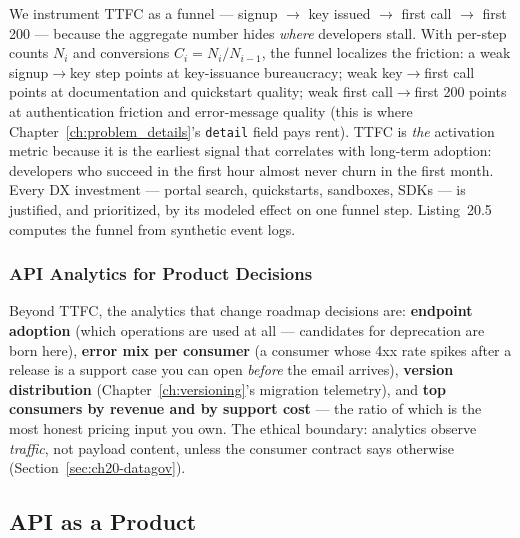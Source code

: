 We instrument TTFC as a funnel --- \textsf{signup} $\rightarrow$
\textsf{key issued} $\rightarrow$ \textsf{first call} $\rightarrow$
\textsf{first 200} --- because the aggregate number hides \emph{where}
developers stall. With per-step counts $N_i$ and conversions
$C_i = N_i / N_{i-1}$, the funnel localizes the friction: a weak
\textsf{signup}$\rightarrow$\textsf{key} step points at key-issuance
bureaucracy; weak \textsf{key}$\rightarrow$\textsf{first call} points at
documentation and quickstart quality; weak \textsf{first
call}$\rightarrow$\textsf{first 200} points at authentication friction and
error-message quality (this is where Chapter~\ref{ch:problem_details}'s
\texttt{detail} field pays rent). TTFC is \emph{the} activation metric
because it is the earliest signal that correlates with long-term adoption:
developers who succeed in the first hour almost never churn in the first
month. Every DX investment --- portal search, quickstarts, sandboxes, SDKs
--- is justified, and prioritized, by its modeled effect on one funnel
step. Listing~20.5 computes the funnel from synthetic event
logs.

\subsubsection{API Analytics for Product Decisions}
Beyond TTFC, the analytics that change roadmap decisions are:
\textbf{endpoint adoption} (which operations are used at all --- candidates
for deprecation are born here), \textbf{error mix per consumer} (a
consumer whose 4xx rate spikes after a release is a support case you can
open \emph{before} the email arrives), \textbf{version distribution}
(Chapter~\ref{ch:versioning}'s migration telemetry), and \textbf{top
consumers by revenue and by support cost} --- the ratio of which is the
most honest pricing input you own. The ethical boundary: analytics observe
\emph{traffic}, not payload content, unless the consumer contract says
otherwise (Section~\ref{sec:ch20-datagov}).

\subsection{API as a Product}
\label{sec:ch20-product}

